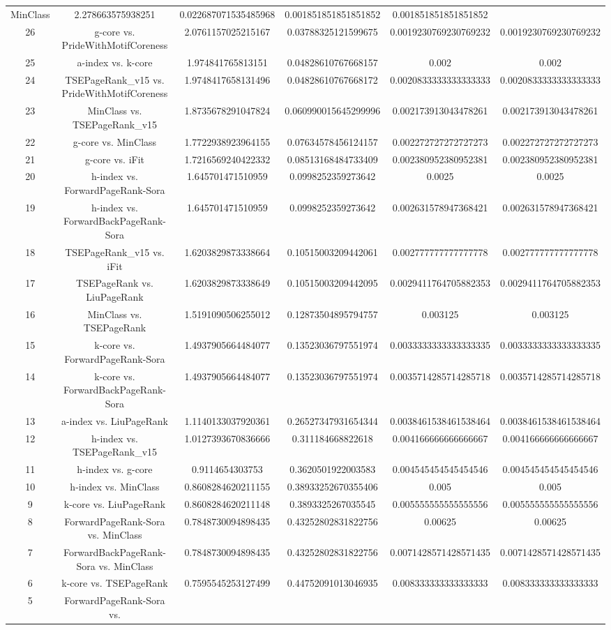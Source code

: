\documentclass[a4paper,10pt]{article}
\begin{document}
\begin{landscape}
\begin{table}[!htp]
\begin{tabular}{cccccc}
MinClass&2.278663575938251&0.022687071535485968&0.001851851851851852&0.001851851851851852\\26&g-core vs. PrideWithMotifCoreness&2.0761157025215167&0.03788325121599675&0.0019230769230769232&0.0019230769230769232\\25&a-index vs. k-core&1.974841765813151&0.04828610767668157&0.002&0.002\\24&TSEPageRank_v15 vs. PrideWithMotifCoreness&1.9748417658131496&0.04828610767668172&0.0020833333333333333&0.0020833333333333333\\23&MinClass vs. TSEPageRank_v15&1.8735678291047824&0.060990015645299996&0.002173913043478261&0.002173913043478261\\22&g-core vs. MinClass&1.7722938923964155&0.07634578456124157&0.002272727272727273&0.002272727272727273\\21&g-core vs. iFit&1.7216569240422332&0.08513168484733409&0.002380952380952381&0.002380952380952381\\20&h-index vs. ForwardPageRank-Sora&1.645701471510959&0.0998252359273642&0.0025&0.0025\\19&h-index vs. ForwardBackPageRank-Sora&1.645701471510959&0.0998252359273642&0.002631578947368421&0.002631578947368421\\18&TSEPageRank_v15 vs. iFit&1.6203829873338664&0.10515003209442061&0.002777777777777778&0.002777777777777778\\17&TSEPageRank vs. LiuPageRank&1.6203829873338649&0.10515003209442095&0.0029411764705882353&0.0029411764705882353\\16&MinClass vs. TSEPageRank&1.5191090506255012&0.12873504895794757&0.003125&0.003125\\15&k-core vs. ForwardPageRank-Sora&1.4937905664484077&0.13523036797551974&0.0033333333333333335&0.0033333333333333335\\14&k-core vs. ForwardBackPageRank-Sora&1.4937905664484077&0.13523036797551974&0.0035714285714285718&0.0035714285714285718\\13&a-index vs. LiuPageRank&1.1140133037920361&0.26527347931654344&0.0038461538461538464&0.0038461538461538464\\12&h-index vs. TSEPageRank_v15&1.0127393670836666&0.311184668822618&0.004166666666666667&0.004166666666666667\\11&h-index vs. g-core&0.9114654303753&0.3620501922003583&0.004545454545454546&0.004545454545454546\\10&h-index vs. MinClass&0.8608284620211155&0.38933252670355406&0.005&0.005\\9&k-core vs. LiuPageRank&0.8608284620211148&0.3893325267035545&0.005555555555555556&0.005555555555555556\\8&ForwardPageRank-Sora vs. MinClass&0.7848730094898435&0.43252802831822756&0.00625&0.00625\\7&ForwardBackPageRank-Sora vs. MinClass&0.7848730094898435&0.43252802831822756&0.0071428571428571435&0.0071428571428571435\\6&k-core vs. TSEPageRank&0.7595545253127499&0.44752091013046935&0.008333333333333333&0.008333333333333333\\5&ForwardPageRank-Sora vs. 
\end{tabular}
\end{table}
\end{landscape}
\end{document}
